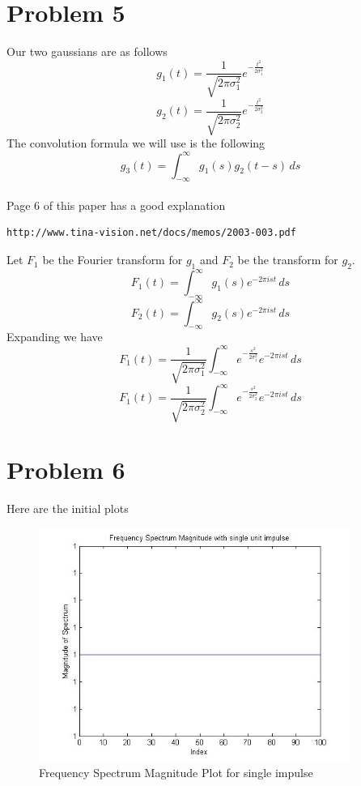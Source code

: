 \documentclass[11pt,psfig]{article}
\begin{document}
\section*{Problem 5}

Our two gaussians are as follows
\[
g_1(t) = \frac{1}{\sqrt{2\pi \sigma_1^2}} e^{-\frac{t^2}{2\sigma_1^2}}
\]
\[
g_2(t) = \frac{1}{\sqrt{2\pi \sigma_2^2}} e^{-\frac{t^2}{2\sigma_2^2}}
\]
The convolution formula we will use is the following
\[
g_3(t) = \int_{-\infty}^{\infty}{g_1(s)g_2(t-s) \, ds}
\]
\\
Page 6 of this paper has a good explanation
\begin{verbatim}
http://www.tina-vision.net/docs/memos/2003-003.pdf
\end{verbatim}
Let $F_1$ be the Fourier transform for $g_1$ and $F_2$ be the transform for $g_2$.\\
\[
F_1(t) = \int_{-\infty}^{\infty}{g_1(s) e^{-2\pi i s t} \, ds}
\]
\[
F_2(t) = \int_{-\infty}^{\infty}{g_2(s) e^{-2\pi i s t} \, ds}
\]
Expanding we have
\[
F_1(t) = \frac{1}{\sqrt{2 \pi \sigma_1^2}} \int_{-\infty}^{\infty}{e^{-\frac{s^2}{2\sigma_1^2}} e^{-2\pi i s t} \, ds}
\]
\[
F_1(t) = \frac{1}{\sqrt{2 \pi \sigma_2^2}} \int_{-\infty}^{\infty}{e^{-\frac{s^2}{2\sigma_2^2}} e^{-2\pi i s t} \, ds}
\]

\section*{Problem 6}

Here are the initial plots

\begin{figure}[H]
\centering
\includegraphics[height=3in]{prob6plot_freq1.jpg}
\caption{Frequency Spectrum Magnitude Plot for single impulse}
\end{figure}
\end{document}
